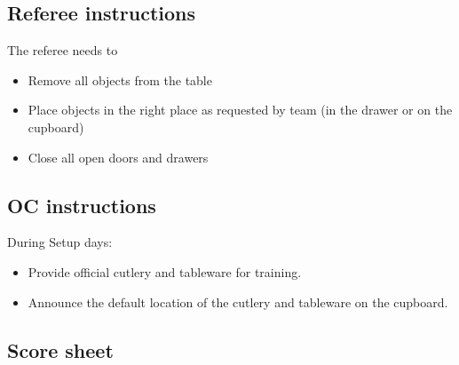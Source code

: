 \subsection*{Referee instructions}

The referee needs to
\begin{itemize}
	\item Remove all objects from the table
	\item Place objects in the right place as requested by team (in the drawer or on the cupboard)
	\item Close all open doors and drawers
\end{itemize}

\subsection*{OC instructions}
During Setup days:
\begin{itemize}
	\item Provide official cutlery and tableware for training.
	\item Announce the default location of the cutlery and tableware on the cupboard.
\end{itemize}


\subsection*{Score sheet}



